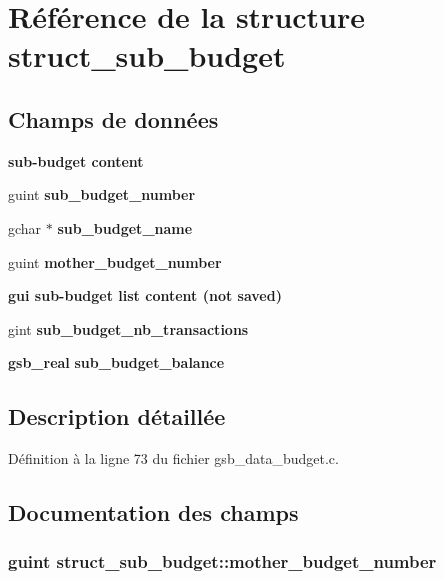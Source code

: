 \section{Référence de la structure struct\_\-sub\_\-budget}
\label{structstruct__sub__budget}
\subsection*{Champs de données}
\begin{Indent}{\bf sub-\/budget content}\par
{\em \label{_amgrpc8df0c5c877e840b08728b20f169b43c}
 }\begin{DoxyCompactItemize}
\item 
guint {\bf sub\_\-budget\_\-number}
\item 
gchar $\ast$ {\bf sub\_\-budget\_\-name}
\item 
guint {\bf mother\_\-budget\_\-number}
\end{DoxyCompactItemize}
\end{Indent}
\begin{Indent}{\bf gui sub-\/budget list content (not saved)}\par
{\em \label{_amgrp0802b2c57df6fd05f023dbc98835d8b5}
 }\begin{DoxyCompactItemize}
\item 
gint {\bf sub\_\-budget\_\-nb\_\-transactions}
\item 
{\bf gsb\_\-real} {\bf sub\_\-budget\_\-balance}
\end{DoxyCompactItemize}
\end{Indent}


\subsection{Description détaillée}


Définition à la ligne 73 du fichier gsb\_\-data\_\-budget.c.



\subsection{Documentation des champs}
\subsubsection[{mother\_\-budget\_\-number}]{\setlength{\rightskip}{0pt plus 5cm}guint {\bf struct\_\-sub\_\-budget::mother\_\-budget\_\-number}}\label{structstruct__sub__budget_a90c0c844343daf16331a57a773d9568b}


